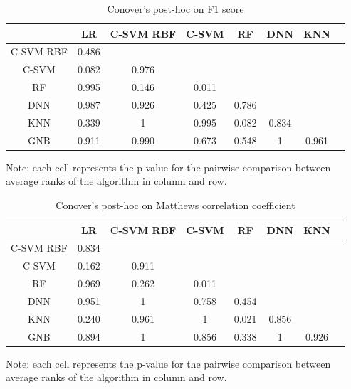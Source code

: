 \documentclass[a4paper,12pt]{article}
\numberwithin{equation}{section}
\begin{document}
\begin{appendices}
\begin{table}[H]
\begin{center}
\caption{Conover's post-hoc on F1 score}
\begin{threeparttable}
\begin{tabular}{ |c|c|c|c|c|c|c|c| } 
 \hline
  & LR & C-SVM RBF & C-SVM & RF & DNN & KNN  \\ 
 \hline 
 C-SVM RBF & 0.486 & & & & & \\[1pt]
 C-SVM  & 0.082 & 0.976 & & & &  \\[1pt]
 RF & 0.995 & 0.146 & 0.011 & & & \\[1pt]
 DNN & 0.987 & 0.926 & 0.425 & 0.786 & & \\[1pt]
 KNN & 0.339 & 1 & 0.995 & 0.082 & 0.834 & \\[1pt]
 GNB & 0.911 & 0.990 & 0.673 & 0.548 & 1 & 0.961 \\[1pt]
 \hline

\end{tabular}
\begin{tablenotes}
\small
\item   Note: each cell represents the p-value for the pairwise comparison between average ranks of the algorithm in column and row.
\end{tablenotes}
\end{threeparttable}
\label{table:12}
\end{center}
\end{table}

\begin{table}[H]
\begin{center}
\caption{Conover's post-hoc on Matthews correlation coefficient}
\begin{threeparttable}
\begin{tabular}{ |c|c|c|c|c|c|c|c| } 
 \hline
  & LR & C-SVM RBF & C-SVM & RF & DNN & KNN  \\ 
 \hline 
 C-SVM RBF & 0.834 & & & & & \\[1pt]
 C-SVM  & 0.162 & 0.911 & & & &  \\[1pt]
 RF & 0.969 & 0.262 & 0.011 & & & \\[1pt]
 DNN & 0.951 & 1 & 0.758 & 0.454 & & \\[1pt]
 KNN & 0.240 & 0.961 & 1 & 0.021 & 0.856 & \\[1pt]
 GNB & 0.894 & 1 & 0.856 & 0.338 & 1 & 0.926 \\[1pt]
 \hline

\end{tabular}
\begin{tablenotes}
\small
\item Note: each cell represents the p-value for the pairwise comparison between average ranks of the algorithm in column and row.
\end{tablenotes}
\end{threeparttable}
\label{table:13}
\end{center}
\end{table}



\end{appendices}
\end{document}
